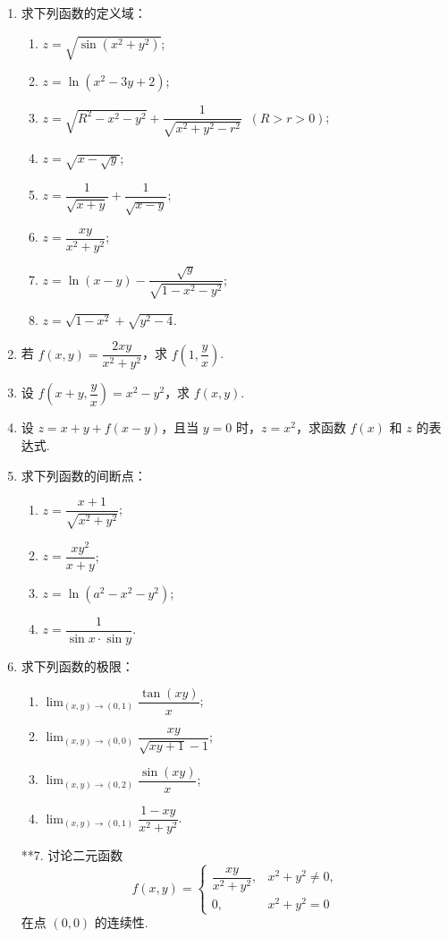 \begin{enumerate}\setlength{\itemsep}{7pt}
    \item 求下列函数的定义域：
    \begin{enumerate}[(1)]\setlength{\itemsep}{5pt}\setlength{\topsep}{15pt}
        \item $z=\sqrt{\sin(x^2+y^2)}$;
        \item $z=\ln(x^2-3y+2)$;
        \item $z=\sqrt{R^2-x^2-y^2}+\dfrac{1}{\sqrt{x^2+y^2-r^2}}\;\;(R>r>0)$;
        \item $z=\sqrt{x-\sqrt{y}}$;
        \item $z=\dfrac{1}{\sqrt{x+y}}+\dfrac{1}{\sqrt{x-y}}$;
        \item $z=\dfrac{xy}{x^2+y^2}$;
        \item $z=\ln(x-y)-\dfrac{\sqrt{y}}{\sqrt{1-x^2-y^2}}$;
        \item $z=\sqrt{1-x^2}+\sqrt{y^2-4}$.
    \end{enumerate}

    \item 若 $f(x, y)=\dfrac{2xy}{x^2+y^2}$，求 $f\left(1,\dfrac{y}{x}\right)$.
    
    \item 设 $f\left(x+y, \dfrac{y}{x}\right)=x^2-y^2$，求 $f(x, y)$.
    
    \item 设 $z=x+y+f(x-y)$，且当 $y=0$ 时，$z=x^2$，求函数 $f(x)$ 和 $z$ 的表达式.
    
    \item 求下列函数的间断点：
    \begin{enumerate}[(1)]\setlength{\itemsep}{5pt}\setlength{\topsep}{15pt}
        \item $z=\dfrac{x+1}{\sqrt{x^2+y^2}}$;
        \item $z=\dfrac{xy^2}{x+y}$;
        \item $z=\ln(a^2-x^2-y^2)$;
        \item $z=\dfrac{1}{\sin x\cdot\sin y}$.
    \end{enumerate}

    \item 求下列函数的极限：
    \begin{enumerate}[(1)]\setlength{\itemsep}{5pt}\setlength{\topsep}{15pt}
        \item $\displaystyle \lim_{(x, y)\to(0, 1)}\dfrac{\tan(xy)}{x}$;
        \item $\displaystyle \lim_{(x, y)\to(0, 0)}\dfrac{xy}{\sqrt{xy+1}-1}$;
        \item $\displaystyle \lim_{(x, y)\to(0, 2)}\dfrac{\sin(xy)}{x}$;
        \item $\displaystyle \lim_{(x, y)\to(0, 1)}\dfrac{1-xy}{x^2+y^2}$.
    \end{enumerate}

    \item[**7.] 讨论二元函数
    \[
        f(x, y)=\begin{cases}
            \dfrac{xy}{x^2+y^2},&x^2+y^2\not=0,\\
            0,&x^2+y^2=0
        \end{cases}
    \]
    在点 $(0, 0)$ 的连续性.  
\end{enumerate}

